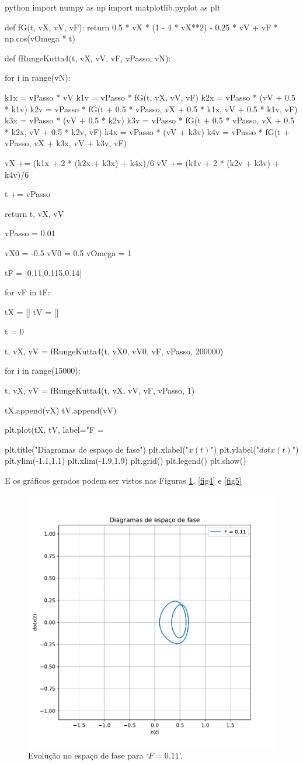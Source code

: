 \documentclass[twoside]{amsart}
\numberwithin{equation}{section}
\begin{document}
\begin{mintedbox}{python}
import numpy as np
import matplotlib.pyplot as plt

def fG(t, vX, vV, vF):
    return 0.5 * vX * (1 - 4 * vX**2) - 0.25 * vV + vF * np.cos(vOmega * t)

def fRungeKutta4(t, vX, vV, vF, vPasso, vN):

    for i in range(vN):

        k1x = vPasso * vV
        k1v = vPasso * fG(t, vX, vV, vF)
        k2x = vPasso * (vV + 0.5 * k1v)
        k2v = vPasso * fG(t + 0.5 * vPasso, vX + 0.5 * k1x, vV + 0.5 * k1v, vF)
        k3x = vPasso * (vV + 0.5 * k2v)
        k3v = vPasso * fG(t + 0.5 * vPasso, vX + 0.5 * k2x, vV + 0.5 * k2v, vF)
        k4x = vPasso * (vV + k3v)
        k4v = vPasso * fG(t + vPasso, vX + k3x, vV + k3v, vF)

        vX += (k1x + 2 * (k2x + k3x) + k4x)/6
        vV += (k1v + 2 * (k2v + k3v) + k4v)/6

        t += vPasso

    return t, vX, vV

vPasso = 0.01

vX0 = -0.5
vV0 = 0.5
vOmega = 1

tF = [0.11,0.115,0.14]

for vF in tF:

    tX = []
    tV = []

    t = 0

    t, vX, vV = fRungeKutta4(t, vX0, vV0, vF, vPasso, 200000)

    for i in range(15000):

        t, vX, vV = fRungeKutta4(t, vX, vV, vF, vPasso, 1)

        tX.append(vX)
        tV.append(vV)

    plt.plot(tX, tV, label="F = %
    
    plt.title("Diagramas de espaço de fase")
    plt.xlabel("$x(t)$")
    plt.ylabel("$dot x(t)$")
    plt.ylim(-1.1,1.1)
    plt.xlim(-1.9,1.9)
    plt.grid()
    plt.legend()
    plt.show()
\end{mintedbox}

E os gráficos gerados podem ser vistos nas Figuras \ref{fig3}, \ref{fig4} e \ref{fig5}

\begin{figure}[h]
    \includegraphics[width=0.5\linewidth]{II-1cf11.pdf}
    \caption{Evolução no espaço de fase para `$F=0.11$'.}
    \label{fig3}
\end{figure}
\end{document}
